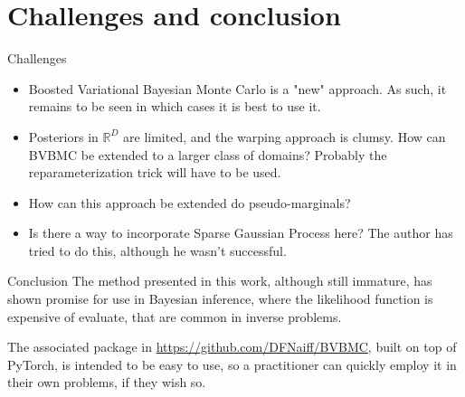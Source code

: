 \documentclass{beamer}
\begin{document}
\section{Challenges and conclusion}
\begin{block}{Challenges}
\begin{itemize}
	\item Boosted Variational Bayesian Monte Carlo is a "new" approach. As such, it remains to be seen in which cases it is best to use it.
	\item Posteriors in $\mathbb{R}^D$ are limited, and the warping approach is clumsy. How can BVBMC be extended to a larger class of domains? Probably the reparameterization trick will have to be used.
	\item How can this approach be extended do pseudo-marginals?
	\item Is there a way to incorporate Sparse Gaussian Process here? The author has tried to do this, although he wasn't successful.
\end{itemize}
\end{block}
\begin{block}{Conclusion}
The method presented in this work, although still immature, has shown promise for use in Bayesian inference, where the likelihood function is expensive of evaluate, that are common in inverse problems.

The associated package in \url{https://github.com/DFNaiff/BVBMC}, built on top of PyTorch, is intended to be easy to use, so a practitioner can quickly employ it in their own problems, if they wish so.

\end{block}
\end{document}
